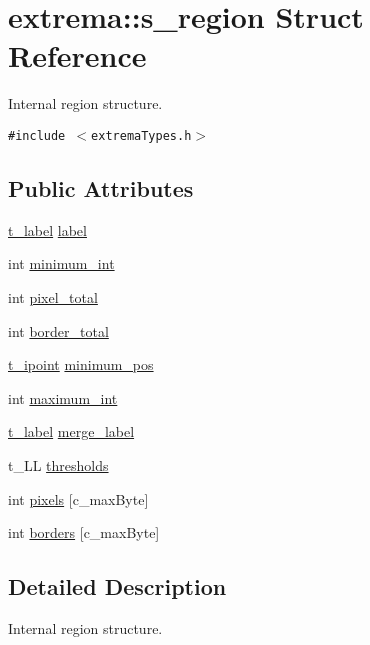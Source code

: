 \hypertarget{structextrema_1_1s__region}{
\section{extrema::s\_\-region Struct Reference}
\label{structextrema_1_1s__region}
}
Internal region structure.  


{\tt \#include $<$extrema\-Types.h$>$}

\subsection*{Public Attributes}
\begin{CompactItemize}
\item 
\hyperlink{namespaceextrema_480109603acd8a50e1dc4e7fa8a08aa6}{t\_\-label} \hyperlink{structextrema_1_1s__region_048f2f8bd9a813fc683216b8dc600a89}{label}
\item 
int \hyperlink{structextrema_1_1s__region_ac4badf0338b8cabe7e7b4352bf89158}{minimum\_\-int}
\item 
int \hyperlink{structextrema_1_1s__region_9622ce8546e5946f93246f0528ab69bb}{pixel\_\-total}
\item 
int \hyperlink{structextrema_1_1s__region_c84747b70879639eac038e376f30e9d2}{border\_\-total}
\item 
\hyperlink{structextrema_1_1t__ipoint}{t\_\-ipoint} \hyperlink{structextrema_1_1s__region_f66ad4c34277f7ecb84e2b924998e7de}{minimum\_\-pos}
\item 
int \hyperlink{structextrema_1_1s__region_341d755dbbf9b17ffcbaaab08a256656}{maximum\_\-int}
\item 
\hyperlink{namespaceextrema_480109603acd8a50e1dc4e7fa8a08aa6}{t\_\-label} \hyperlink{structextrema_1_1s__region_c9fa06cf66db56167d3b2a3fa8efdeb6}{merge\_\-label}
\item 
t\_\-LL \hyperlink{structextrema_1_1s__region_2108fd34e92ccd680356907be7859dd6}{thresholds}
\item 
int \hyperlink{structextrema_1_1s__region_733dea443b88f21ebb076daa57db365b}{pixels} \mbox{[}c\_\-max\-Byte\mbox{]}
\item 
int \hyperlink{structextrema_1_1s__region_8a793aab0afc0fc407d1589fe2f96fc4}{borders} \mbox{[}c\_\-max\-Byte\mbox{]}
\end{CompactItemize}


\subsection{Detailed Description}
Internal region structure. 



